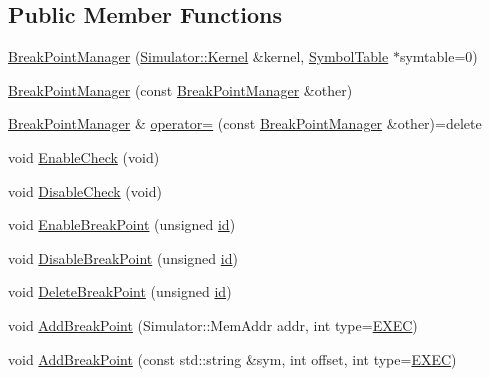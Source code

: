 \subsection*{Public Member Functions}
\begin{DoxyCompactItemize}
\item 
\hyperlink{class_simulator_1_1_break_point_manager_aca59f29e711bdc9bd94779d66d8c31db}{Break\+Point\+Manager} (\hyperlink{class_simulator_1_1_kernel}{Simulator\+::\+Kernel} \&kernel, \hyperlink{class_simulator_1_1_symbol_table}{Symbol\+Table} $\ast$symtable=0)
\item 
\hyperlink{class_simulator_1_1_break_point_manager_a63e7c321d4be88b6592d66eb87e4bd7d}{Break\+Point\+Manager} (const \hyperlink{class_simulator_1_1_break_point_manager}{Break\+Point\+Manager} \&other)
\item 
\hyperlink{class_simulator_1_1_break_point_manager}{Break\+Point\+Manager} \& \hyperlink{class_simulator_1_1_break_point_manager_a9bc83b7fec833a21bcc68f93b3f3c591}{operator=} (const \hyperlink{class_simulator_1_1_break_point_manager}{Break\+Point\+Manager} \&other)=delete
\item 
void \hyperlink{class_simulator_1_1_break_point_manager_a829d4497ea561c68acfade511c84a20b}{Enable\+Check} (void)
\item 
void \hyperlink{class_simulator_1_1_break_point_manager_ac9a420fe4c73465899c35a59bf2f6719}{Disable\+Check} (void)
\item 
void \hyperlink{class_simulator_1_1_break_point_manager_af5a8762aeb09e3da6365cee32255ecd2}{Enable\+Break\+Point} (unsigned \hyperlink{mtconf_8c_aa3185401f04d30bd505daebf48c39cc5}{id})
\item 
void \hyperlink{class_simulator_1_1_break_point_manager_a03cc25e048450a65df43303e046c3011}{Disable\+Break\+Point} (unsigned \hyperlink{mtconf_8c_aa3185401f04d30bd505daebf48c39cc5}{id})
\item 
void \hyperlink{class_simulator_1_1_break_point_manager_a9960fe716c6474b4e7a43b254ed1faee}{Delete\+Break\+Point} (unsigned \hyperlink{mtconf_8c_aa3185401f04d30bd505daebf48c39cc5}{id})
\item 
void \hyperlink{class_simulator_1_1_break_point_manager_a9f1e6e644de80d7bba2a66551dda6aac}{Add\+Break\+Point} (Simulator\+::\+Mem\+Addr addr, int type=\hyperlink{class_simulator_1_1_break_point_manager_a425072fcb3c0e59e3fb6f300d6afbd7ba22cfe04247cd5846d978d8ad19755ec4}{E\+X\+E\+C})
\item 
void \hyperlink{class_simulator_1_1_break_point_manager_a7d67935bd2646d51307963bcb48163b3}{Add\+Break\+Point} (const std\+::string \&sym, int offset, int type=\hyperlink{class_simulator_1_1_break_point_manager_a425072fcb3c0e59e3fb6f300d6afbd7ba22cfe04247cd5846d978d8ad19755ec4}{E\+X\+E\+C})

\end{DoxyCompactItemize}
